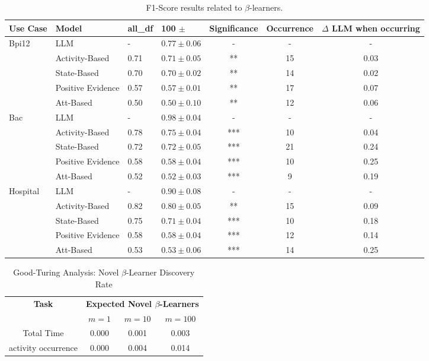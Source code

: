 \documentclass[manuscript,screen,review]{acmart}
\begin{document}
\begin{table}[t!]
\centering
\small
\caption{F1-Score results related to $\beta$-learners.}
\begin{tabular}{|l|l|l|l|c|c|c|}
\hline
\textbf{Use Case} & \textbf{Model} & \textbf{all\_df} & \textbf{100} $\pm$ & \textbf{Significance}  & \textbf{Occurrence}  &$\Delta$ LLM when occurring\\
\hline
\multirow{5}{*}{Bpi12}
& LLM & - & $0.77 \pm 0.06$ & -  &- &-\\
& Activity-Based & 0.71 & $0.71 \pm 0.05$ & **  &15 & 0.03\\
& State-Based & 0.70 & $0.70 \pm 0.02$ & **  &14 & 0.02\\
& Positive Evidence & 0.57 & $0.57 \pm 0.01$ & **  &17 & 0.07  \\ 
& Att-Based & 0.50 & $0.50 \pm 0.10$ & **  &12 & 0.06 \\
\hline
\multirow{5}{*}{Bac}
& LLM & - & $0.98 \pm 0.04$ & -  &- &-\\
& Activity-Based & 0.78 & $0.75 \pm 0.04$ & ***  &10 & 0.04\\
& State-Based & 0.72 & $0.72 \pm 0.05$ & ***  &21 & 0.24\\
& Positive Evidence & 0.58 & $0.58 \pm 0.04$ & ***  &10 & 0.25\\
& Att-Based & 0.52 & $0.52 \pm 0.03$ & ***  &9 & 0.19\\
\hline
\multirow{5}{*}{Hospital}
& LLM & - & $0.90 \pm 0.08$ & -  &- &-\\
& Activity-Based & 0.82 & $0.80 \pm 0.05$ & ** &15 & 0.09 \\
& State-Based & 0.75 & $0.71 \pm 0.04$ & ***  &10 & 0.18\\
& Positive Evidence & 0.58 & $0.58 \pm 0.04$ & ***  &12 & 0.14\\
& Att-Based & 0.53 & $0.53 \pm 0.06$ & ***  &14 & 0.25\\
\hline
\end{tabular}
\label{tab:f1_beta}
\end{table}

\begin{table}[t!]
\centering
\caption{Good-Turing Analysis: Novel $\beta$-Learner Discovery Rate}
\begin{tabular}{|c|c|c|c|}
\hline
\multirow{2}{*}{\textbf{Task}} & \multicolumn{3}{c|}{\textbf{Expected Novel $\beta$-Learners}} \\
\cline{2-4}
 & $m=1$ & $m=10$ & $m=100$ \\
\hline
Total Time & 0.000 & 0.001 & 0.003 \\
\hline
activity occurrence & 0.000 & 0.004 & 0.014 \\
\hline
\end{tabular}
\label{tab:good_turing_all}
\end{table}
\end{document}
